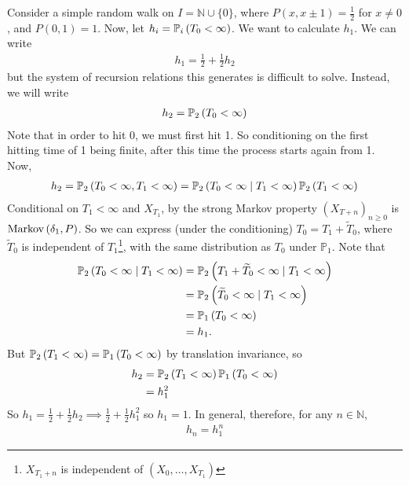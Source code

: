 \begin{example}
	Consider a simple random walk on $I = \mathbb N \cup \{0\}$, where $P(x,x\pm 1) = \frac{1}{2}$ for $x \neq 0$, and $P(0,1) = 1$.
	Now, let $h_i = \mathbb{P}_{i}\left({T_0 < \infty}\right)$.
	We want to calculate $h_1$.
	We can write
	\begin{align*}
		h_1 = \frac{1}{2} + \frac{1}{2} h_2
	\end{align*}
	but the system of recursion relations this generates is difficult to solve.
	Instead, we will write
	\begin{align*}
		h_2 = \mathbb{P}_{2}\left({T_0 < \infty}\right)
	\end{align*}
	Note that in order to hit 0, we must first hit 1.
	So conditioning on the first hitting time of 1 being finite, after this time the process starts again from 1.
	Now,
	\begin{align*}
		h_2 = \mathbb{P}_{2}\left({T_0 < \infty, T_1 < \infty}\right) = \mathbb{P}_{2}\left({T_0 < \infty \mid T_1 < \infty}\right) \mathbb{P}_{2}\left({T_1 < \infty}\right)
	\end{align*}
	Conditional on $T_1 < \infty$ and $X_{T_1}$, by the strong Markov property $(X_{T+n})_{n \geq 0}$ is $\operatorname{Markov}\left({\delta_1, P}\right)$. So we can express (under the conditioning)  $T_0 = T_1 + \widetilde T_0$, where $\widetilde T_0$ is independent of $T_1$\footnote{$X_{T_1 + n}$ is independent of $(X_0, \dots, X_{T_1})$}, with the same distribution as $T_0$ under $\mathbb P_1$.
	Note that
	\begin{align*}
		\mathbb{P}_{2}\left({T_0 < \infty \mid T_1 < \infty}\right) &= \mathbb{P}_{2}\left({T_1 + \widetilde T_0 < \infty \mid T_1 < \infty}\right) \\
		&= \mathbb{P}_{2}\left({\widetilde T_0 < \infty \mid T_1 < \infty}\right) \\
		&= \mathbb{P}_{1}\left({T_0 < \infty}\right) \\
		&= h_1.
	\end{align*}
	But $\mathbb{P}_{2}\left({T_1 < \infty}\right) = \mathbb{P}_{1}\left({T_0 < \infty}\right)$ by translation invariance, so
	\begin{align*}
		h_2 &= \mathbb{P}_{2}\left({T_1 < \infty}\right) \mathbb{P}_{1}\left({T_0 < \infty}\right) \\
		&= h_1^2
	\end{align*}
	So $h_1 = \frac{1}{2} + \frac{1}{2}h_2 \implies \frac{1}{2} + \frac{1}{2} h_1^2$ so $h_1 = 1$.
	In general, therefore, for any $n \in \mathbb N$,
	\begin{align*}
		h_n = h_1^n
	\end{align*}
\end{example}